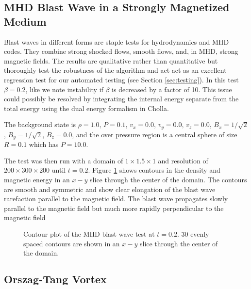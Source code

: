 



\subsection{MHD Blast Wave in a Strongly Magnetized Medium}
\label{sec:mhd-blast}

Blast waves in different forms are staple tests for hydrodynamics and MHD codes. They combine strong shocked flows, smooth flows, and, in MHD, strong magnetic fields. The results are qualitative rather than quantitative but thoroughly test the robustness of the algorithm and act act as an excellent regression test for our automated testing (see Section \ref{sec:testing}). In this test $\beta = 0.2$, like \cite{stone_2009} we note instability if $\beta$ is decreased by a factor of 10. This issue could possibly be resolved by integrating the internal energy separate from the total energy using the dual energy formalism in Cholla.

The background state is
$\rho = 1.0$,
$P = 0.1$,
$v_x = 0.0$,
$v_y = 0.0$,
$v_z = 0.0$,
$B_x = 1/\sqrt{2}$,
$B_y = 1/\sqrt{2}$,
$B_z = 0.0$,
and the over pressure region is a central sphere of size $R = 0.1$ which has $P=10.0$.

The test was then run with a domain of $1\times1.5\times1$ and resolution of $200\times300\times200$ until $t = 0.2$. Figure \ref{fig:blast} shows contours in the density and magnetic energy in an $x-y$ slice through the center of the domain. The contours are smooth and symmetric and show clear elongation of the blast wave rarefaction parallel to the magnetic field. The blast wave propagates slowly parallel to the magnetic field but much more rapidly perpendicular to the magnetic field

\begin{figure}[ht!]
    \caption{Contour plot of the MHD blast wave test at $t=0.2$. 30 evenly spaced contours are shown in an $x-y$ slice through the center of the domain. }
    \label{fig:blast}
\end{figure}

\subsection{Orszag-Tang Vortex}
\label{sec:otv}

